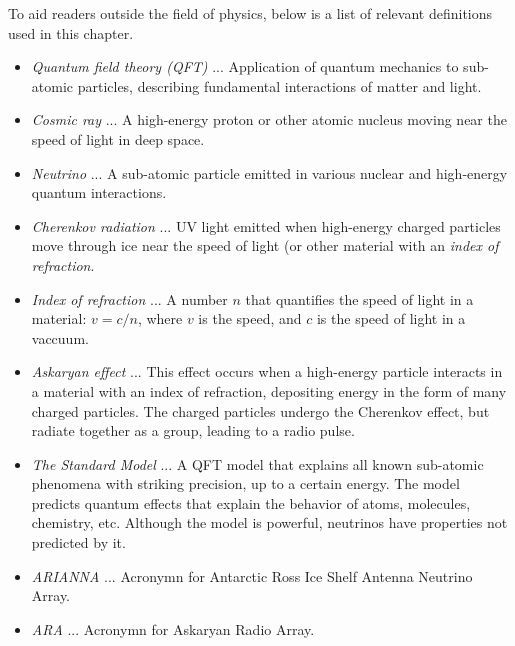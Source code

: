 \documentclass[../../main.tex]{subfiles}
\begin{document}
To aid readers outside the field of physics, below is a list of relevant definitions used in this chapter.
\begin{itemize}
\item \textit{Quantum field theory (QFT)} ... Application of quantum mechanics to sub-atomic particles, describing fundamental interactions of matter and light.
\item \textit{Cosmic ray} ... A high-energy proton or other atomic nucleus moving near the speed of light in deep space.
\item \textit{Neutrino} ... A sub-atomic particle emitted in various nuclear and high-energy quantum interactions.
\item \textit{Cherenkov radiation} ... UV light emitted when high-energy charged particles move through ice near the speed of light (or other material with an \textit{index of refraction}.
\item \textit{Index of refraction} ... A number $n$ that quantifies the speed of light in a material: $v = c/n$, where $v$ is the speed, and $c$ is the speed of light in a vaccuum.
\item \textit{Askaryan effect} ... This effect occurs when a high-energy particle interacts in a material with an index of refraction, depositing energy in the form of many charged particles.  The charged particles undergo the Cherenkov effect, but radiate together as a group, leading to a radio pulse. 
\item \textit{The Standard Model} ... A QFT model that explains all known sub-atomic phenomena with striking precision, up to a certain energy.  The model predicts quantum effects that explain the behavior of atoms, molecules, chemistry, etc.  Although the model is powerful, neutrinos have properties not predicted by it.
\item \textit{ARIANNA} ... Acronymn for Antarctic Ross Ice Shelf Antenna Neutrino Array.
\item \textit{ARA} ... Acronymn for Askaryan Radio Array.
\end{itemize}
\end{document}
